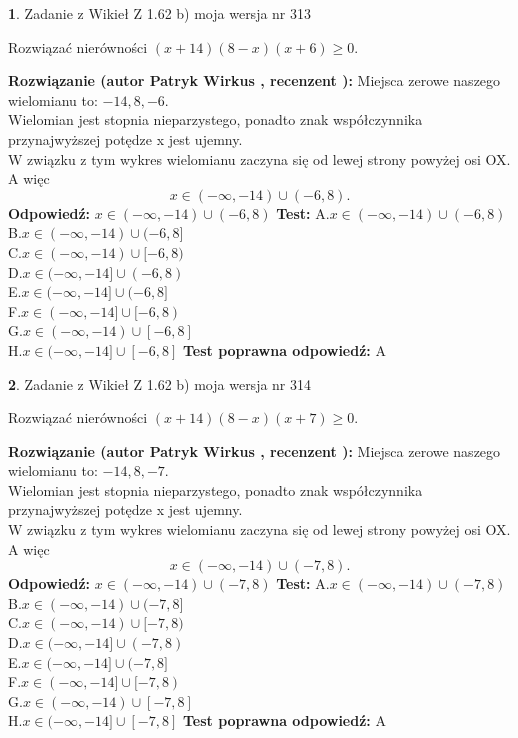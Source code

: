\documentclass[12pt, a4paper]{article}
\theoremstyle{definition} %
\newtheorem{zad}{}
\newcommand{\zadStart}[1]{\begin{zad}#1\newline}
\newcommand{\zadStop}{\end{zad}}
\newcommand{\rozwStart}[2]{\noindent \textbf{Rozwiązanie (autor #1 , recenzent #2): }\newline}
\newcommand{\rozwStop}{\newline}
\newcommand{\odpStart}{\noindent \textbf{Odpowiedź:}\newline}
\newcommand{\odpStop}{\newline}
\newcommand{\testStart}{\noindent \textbf{Test:}\newline}
\newcommand{\testStop}{\newline}
\newcommand{\kluczStart}{\noindent \textbf{Test poprawna odpowiedź:}\newline}
\newcommand{\kluczStop}{\newline}
\begin{document}
\zadStart{Zadanie z Wikieł Z 1.62 b) moja wersja nr 313}

Rozwiązać nierówności $(x+14)(8-x)(x+6)\ge0$.
\zadStop
\rozwStart{Patryk Wirkus}{}
Miejsca zerowe naszego wielomianu to: $-14, 8, -6$.\\
Wielomian jest stopnia nieparzystego, ponadto znak współczynnika przy\linebreak najwyższej potędze x jest ujemny.\\ W związku z tym wykres wielomianu zaczyna się od lewej strony powyżej osi OX. A więc $$x \in (-\infty,-14) \cup (-6,8).$$
\rozwStop
\odpStart
$x \in (-\infty,-14) \cup (-6,8)$
\odpStop
\testStart
A.$x \in (-\infty,-14) \cup (-6,8)$\\
B.$x \in (-\infty,-14) \cup (-6,8]$\\
C.$x \in (-\infty,-14) \cup [-6,8)$\\
D.$x \in (-\infty,-14] \cup (-6,8)$\\
E.$x \in (-\infty,-14] \cup (-6,8]$\\
F.$x \in (-\infty,-14] \cup [-6,8)$\\
G.$x \in (-\infty,-14) \cup [-6,8]$\\
H.$x \in (-\infty,-14] \cup [-6,8]$
\testStop
\kluczStart
A
\kluczStop



\zadStart{Zadanie z Wikieł Z 1.62 b) moja wersja nr 314}

Rozwiązać nierówności $(x+14)(8-x)(x+7)\ge0$.
\zadStop
\rozwStart{Patryk Wirkus}{}
Miejsca zerowe naszego wielomianu to: $-14, 8, -7$.\\
Wielomian jest stopnia nieparzystego, ponadto znak współczynnika przy\linebreak najwyższej potędze x jest ujemny.\\ W związku z tym wykres wielomianu zaczyna się od lewej strony powyżej osi OX. A więc $$x \in (-\infty,-14) \cup (-7,8).$$
\rozwStop
\odpStart
$x \in (-\infty,-14) \cup (-7,8)$
\odpStop
\testStart
A.$x \in (-\infty,-14) \cup (-7,8)$\\
B.$x \in (-\infty,-14) \cup (-7,8]$\\
C.$x \in (-\infty,-14) \cup [-7,8)$\\
D.$x \in (-\infty,-14] \cup (-7,8)$\\
E.$x \in (-\infty,-14] \cup (-7,8]$\\
F.$x \in (-\infty,-14] \cup [-7,8)$\\
G.$x \in (-\infty,-14) \cup [-7,8]$\\
H.$x \in (-\infty,-14] \cup [-7,8]$
\testStop
\kluczStart
A
\kluczStop
\end{document}
